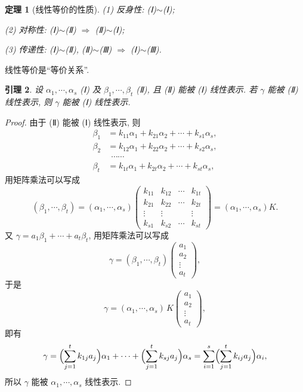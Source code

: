 \documentclass[UTF8,11pt]{ctexart}
\theoremstyle{cnthm}
\newtheorem{thm}{定理}[section]
\newtheorem{lem}[thm]{引理}
\begin{document}
\begin{thm}[线性等价的性质]
(1) 反身性: (Ⅰ)$\sim$(Ⅰ);

(2) 对称性: (Ⅰ)$\sim$(Ⅱ) $\Rightarrow$ (Ⅱ)$\sim$(Ⅰ);

(3) 传递性: (Ⅰ)$\sim$(Ⅱ), (Ⅱ)$\sim$(Ⅲ) $\Rightarrow$ (Ⅰ)$\sim$(Ⅲ).
\end{thm}

线性等价是``等价关系''.

\begin{lem}
设 $\alpha_1,\cdots,\alpha_s$ (Ⅰ) 及 $\beta_1,\cdots,\beta_t$ (Ⅱ), 且 (Ⅱ) 能被 (Ⅰ) 线性表示. 若 $\gamma$ 能被 (Ⅱ) 线性表示, 则 $\gamma$ 能被 (Ⅰ) 线性表示.
\end{lem}

\begin{proof}
由于 (Ⅱ) 能被 (Ⅰ) 线性表示, 则
\[
\begin{aligned}
\beta_1&=k_{11}\alpha_1+k_{21}\alpha_2+\cdots+k_{s1}\alpha_s,\\
\beta_2&=k_{12}\alpha_1+k_{22}\alpha_2+\cdots+k_{s2}\alpha_s,\\
&\ \ \cdots\cdots\\
\beta_t&=k_{1t}\alpha_1+k_{2t}\alpha_2+\cdots+k_{st}\alpha_s,
\end{aligned}
\]
用矩阵乘法可以写成
\[
(\beta_1,\cdots,\beta_t)=(\alpha_1,\cdots,\alpha_s)
\begin{pmatrix}
k_{11} & k_{12} & \cdots & k_{1t}\\
k_{21} & k_{22} & \cdots & k_{2t}\\
\vdots & \vdots & & \vdots\\
k_{s1} & k_{s2} & \cdots & k_{st}
\end{pmatrix}
=(\alpha_1,\cdots,\alpha_s)K .
\]
又 $\gamma=a_1\beta_1+\cdots+a_t\beta_t$, 用矩阵乘法可以写成
\[
\gamma=(\beta_1,\cdots,\beta_t)\begin{pmatrix}a_1\\a_2\\\vdots\\a_t\end{pmatrix},
\]
于是
\[
\gamma=(\alpha_1,\cdots,\alpha_s)\,K\begin{pmatrix}a_1\\a_2\\\vdots\\a_t\end{pmatrix},
\]
即有
\[
\gamma=\Bigl(\sum_{j=1}^{t}k_{1j}a_j\Bigr)\alpha_1+\cdots+\Bigl(\sum_{j=1}^{t}k_{sj}a_j\Bigr)\alpha_s
=\sum_{i=1}^{s}\Bigl(\sum_{j=1}^{t}k_{ij}a_j\Bigr)\alpha_i ,
\]
所以 $\gamma$ 能被 $\alpha_1,\cdots,\alpha_s$ 线性表示.
\end{proof}
\end{document}
